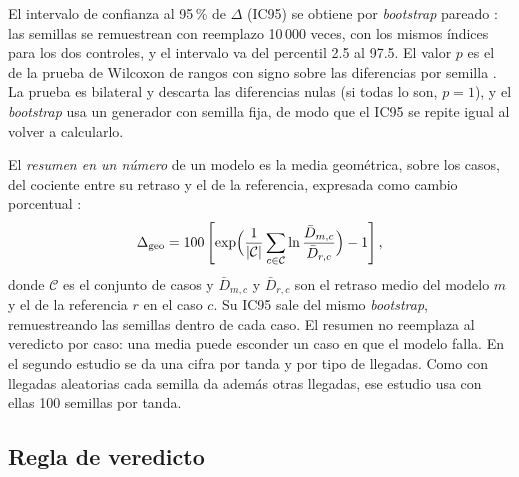 El intervalo de confianza al 95\,\% de $\Delta$ (IC95) se obtiene por
\textit{bootstrap} pareado \citep{Efron1993_Bootstrap}: las semillas se
remuestrean con reemplazo 10\,000 veces, con los mismos índices para
los dos controles, y el intervalo va del percentil 2.5 al 97.5. El
valor $p$ es el de la prueba de Wilcoxon de rangos con signo sobre las
diferencias por semilla \citep{Wilcoxon1945_Rangos}. La prueba es
bilateral y descarta las diferencias nulas (si todas lo son, $p = 1$), y
el \textit{bootstrap} usa un generador con semilla fija, de modo que el
IC95 se repite igual al volver a calcularlo.

El \emph{resumen en un número} de un modelo es la media geométrica,
sobre los casos, del cociente entre su retraso y el de la referencia,
expresada como cambio porcentual \citep{Fleming1986_MediaGeometrica}:
\begin{equation}
  \Delta_{\text{geo}} = 100 \left[ \exp\Bigl( \frac{1}{|\mathcal{C}|}
    \sum_{c \in \mathcal{C}} \ln \frac{\bar D_{m,c}}{\bar D_{r,c}} \Bigr) - 1 \right],
  \label{eq:media-geometrica}
\end{equation}
donde $\mathcal{C}$ es el conjunto de casos y $\bar D_{m,c}$ y
$\bar D_{r,c}$ son el retraso medio del modelo $m$ y el de la
referencia $r$ en el caso $c$. Su IC95 sale del mismo
\textit{bootstrap}, remuestreando las semillas dentro de cada caso. El
resumen no reemplaza al veredicto por caso: una media puede esconder un
caso en que el modelo falla. En el segundo estudio se da una cifra por
tanda y por tipo de llegadas. Como con llegadas aleatorias cada semilla
da además otras llegadas, ese estudio usa con ellas 100 semillas por
tanda.

\subsection{Regla de veredicto}
\label{sec:veredicto}

